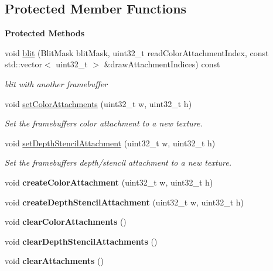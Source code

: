 \subsection*{Protected Member Functions}
\begin{Indent}\textbf{ Protected Methods}\par
\begin{DoxyCompactItemize}
\item 
void \mbox{\hyperlink{classrev_1_1_frame_buffer_a03d7ca6784c7b4d277c47c29f81f631a}{blit}} (Blit\+Mask blit\+Mask, uint32\+\_\+t read\+Color\+Attachment\+Index, const std\+::vector$<$ uint32\+\_\+t $>$ \&draw\+Attachment\+Indices) const
\begin{DoxyCompactList}\small\item\em blit with another framebuffer \end{DoxyCompactList}\item 
void \mbox{\hyperlink{classrev_1_1_frame_buffer_a477861e1360aa2ac238c36f7421faa1f}{set\+Color\+Attachments}} (uint32\+\_\+t w, uint32\+\_\+t h)
\begin{DoxyCompactList}\small\item\em Set the framebuffer\textquotesingle{}s color attachment to a new texture. \end{DoxyCompactList}\item 
\mbox{\label{classrev_1_1_frame_buffer_a5ad4390c6f3796325bdf18f3b13366f2}} 
void \mbox{\hyperlink{classrev_1_1_frame_buffer_a5ad4390c6f3796325bdf18f3b13366f2}{set\+Depth\+Stencil\+Attachment}} (uint32\+\_\+t w, uint32\+\_\+t h)
\begin{DoxyCompactList}\small\item\em Set the framebuffer\textquotesingle{}s depth/stencil attachment to a new texture. \end{DoxyCompactList}\item 
\mbox{\label{classrev_1_1_frame_buffer_a8f4d5f8a74d7ca5a3f571d9769ef2fb7}} 
void {\bfseries create\+Color\+Attachment} (uint32\+\_\+t w, uint32\+\_\+t h)
\item 
\mbox{\label{classrev_1_1_frame_buffer_a78f3e1425d94cfb28ee05c783c7f0318}} 
void {\bfseries create\+Depth\+Stencil\+Attachment} (uint32\+\_\+t w, uint32\+\_\+t h)
\item 
\mbox{\label{classrev_1_1_frame_buffer_a7fffc703da74c0be3dbe66499465bd83}} 
void {\bfseries clear\+Color\+Attachments} ()
\item 
\mbox{\label{classrev_1_1_frame_buffer_ad049b939909e3ef87cc9a674ff071491}} 
void {\bfseries clear\+Depth\+Stencil\+Attachments} ()
\item 
\mbox{\label{classrev_1_1_frame_buffer_a1eb7b90799af4c9561cedb3afab696fa}} 
void {\bfseries clear\+Attachments} ()
\end{DoxyCompactItemize}
\end{Indent}
